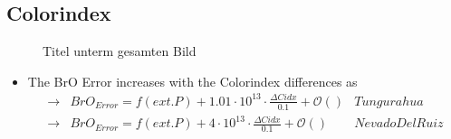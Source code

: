 \documentclass  [
  paper    = a4,
  BCOR     = 10mm,
  twoside,
  fontsize = 12pt,
  fleqn,
  toc      = bibnumbered,
  toc      = listofnumbered,
  numbers  = noendperiod,
  headings = normal,
  listof   = leveldown,
  version  = 3.03
]                                       {scrreprt}
\begin{document}
	\subsection{Colorindex}
	\begin{figure}[h!]		
		\caption{Titel unterm gesamten Bild}
	\end{figure}
	\begin{itemize}
		\item 	The BrO Error increases with the Colorindex differences as \\
		\begin{align*}
		\rightarrow&  BrO_{Error} = f(ext. P)+ 1.01\cdot10^{13}\cdot\frac{\Delta Cidx}{0.1} + \mathcal{O}\left(\right) & Tungurahua\\
		\rightarrow&  BrO_{Error} = f(ext. P)+  4\cdot10^{13}\cdot\frac{\Delta Cidx}{0.1} + \mathcal{O}\left(\right) & Nevado Del Ruiz\\
		\end{align*}
	\end{itemize}
\end{document}
